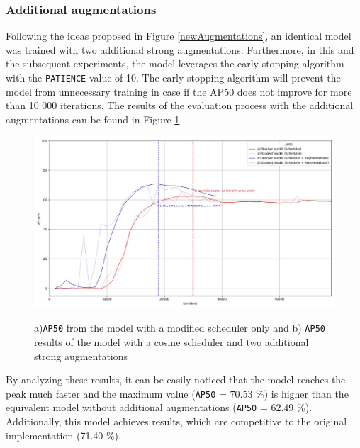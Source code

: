 \subsubsection{Additional augmentations}
\label{augmentations_section} 
Following the ideas proposed in Figure \ref{newAugmentations}, an identical model was trained with two additional strong augmentations. Furthermore, in this and the subsequent  experiments, the model leverages the early stopping algorithm with the \texttt{PATIENCE} value of 10. The early stopping algorithm will prevent the model from unnecessary training in case if the AP50 does not improve for more than 10 000 iterations. The results of the evaluation process with the additional augmentations can be found in Figure \ref{augmentation_experiment}. 
 
\begin{figure}[htb]
	\begin{center}
		\includegraphics[width=14cm]{./AP50_augmentation.jpg}
	\end{center}
	\caption{a)\texttt{AP50} from the model with a modified scheduler only and b) \texttt{AP50} results of the model with a cosine scheduler and two additional strong augmentations}
	\begin{center}
		\label{augmentation_experiment}
	\end{center}
\end{figure}
\FloatBarrier  

By analyzing these results, it can be easily noticed that the model reaches the peak much faster and the maximum value (\texttt{AP50} = 70.53 \%) is higher than the equivalent model without additional augmentations (\texttt{AP50} = 62.49 \%). Additionally, this model achieves results, which are competitive to the original implementation (71.40 \%).


